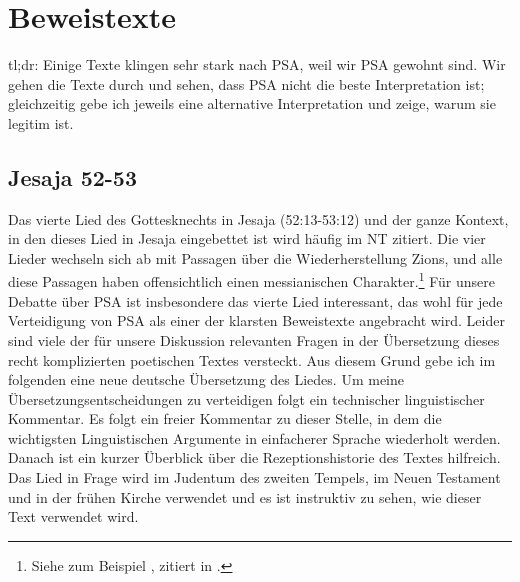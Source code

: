 \chapter{Beweistexte}
tl;dr:
Einige Texte klingen sehr stark nach PSA, weil wir PSA gewohnt sind.
Wir gehen die Texte durch und sehen, dass PSA nicht die beste Interpretation ist; gleichzeitig gebe ich jeweils eine alternative Interpretation und zeige, warum sie legitim ist.

\section{Jesaja 52-53}
Das vierte Lied des Gottesknechts in Jesaja (52:13-53:12) und der ganze Kontext, in den dieses Lied in Jesaja eingebettet ist
wird häufig im NT zitiert.
Die vier Lieder wechseln sich ab mit Passagen über die Wiederherstellung Zions, und alle diese Passagen haben offensichtlich einen messianischen Charakter.\footnote{
Siehe zum Beispiel , zitiert in .}
Für unsere Debatte über PSA ist insbesondere das vierte Lied interessant, das wohl für jede Verteidigung von PSA als einer der klarsten Beweistexte angebracht wird.
Leider sind viele der für unsere Diskussion relevanten Fragen in der Übersetzung dieses recht komplizierten poetischen Textes versteckt.
Aus diesem Grund gebe ich im folgenden eine neue deutsche Übersetzung des Liedes.
Um meine Übersetzungsentscheidungen zu verteidigen folgt ein technischer linguistischer Kommentar.
Es folgt ein freier Kommentar zu dieser Stelle, in dem die wichtigsten Linguistischen Argumente in einfacherer Sprache wiederholt werden.
Danach ist ein kurzer Überblick über die Rezeptionshistorie des Textes hilfreich.
Das Lied in Frage wird im Judentum des zweiten Tempels, im Neuen Testament und in der frühen Kirche verwendet und es ist instruktiv zu sehen,
wie dieser Text verwendet wird.

